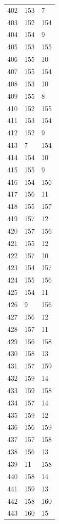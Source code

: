 \documentclass[a4paper,11pt]{article}
\begin{document}
\begin{center}
\begin{longtable}{|R{1.5cm}|R{1.5cm}|R{1.5cm}|}
  402 &  153 &    7 \\
  403 &  152 &  154 \\
  404 &  154 &    9 \\
  405 &  153 &  155 \\
  406 &  155 &   10 \\
  407 &  155 &  154 \\
  408 &  153 &   10 \\
  409 &  155 &    8 \\
  410 &  152 &  155 \\
  411 &  153 &  154 \\
  412 &  152 &    9 \\
  413 &    7 &  154 \\
  414 &  154 &   10 \\
  415 &  155 &    9 \\
  416 &  154 &  156 \\
  417 &  156 &   11 \\
  418 &  155 &  157 \\
  419 &  157 &   12 \\
  420 &  157 &  156 \\
  421 &  155 &   12 \\
  422 &  157 &   10 \\
  423 &  154 &  157 \\
  424 &  155 &  156 \\
  425 &  154 &   11 \\
  426 &    9 &  156 \\
  427 &  156 &   12 \\
  428 &  157 &   11 \\
  429 &  156 &  158 \\
  430 &  158 &   13 \\
  431 &  157 &  159 \\
  432 &  159 &   14 \\
  433 &  159 &  158 \\
  434 &  157 &   14 \\
  435 &  159 &   12 \\
  436 &  156 &  159 \\
  437 &  157 &  158 \\
  438 &  156 &   13 \\
  439 &   11 &  158 \\
  440 &  158 &   14 \\
  441 &  159 &   13 \\
  442 &  158 &  160 \\
  443 &  160 &   15 \\

\end{longtable}
\end{center}
\end{document}
